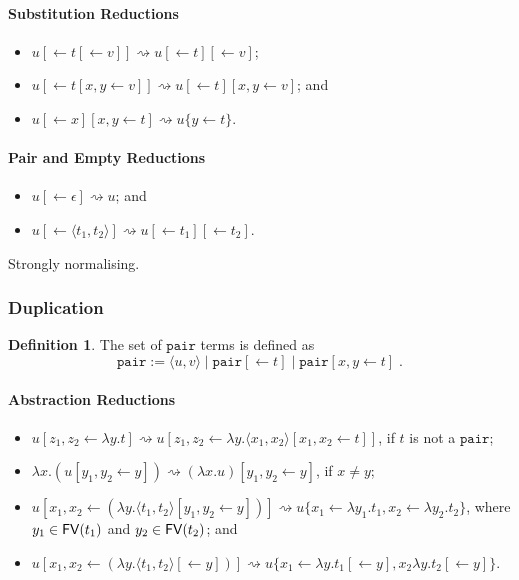 \documentclass[11pt,a4paper]{article}
\theoremstyle{definition}
\newtheorem{definition}{Definition}
\theoremstyle{plain}
\theoremstyle{remark}
\begin{document}
\paragraph{Substitution Reductions}

\begin{itemize}
	\item $u[\leftarrow t[\leftarrow v]]\rightsquigarrow u[\leftarrow t][\leftarrow v]$;
	\item $u[\leftarrow t[x,y\leftarrow v]]\rightsquigarrow u[\leftarrow t][x,y\leftarrow v]$; and
	\item $u[\leftarrow x][x,y\leftarrow t]\rightsquigarrow u\{y\leftarrow t\}$.
\end{itemize}

\paragraph{Pair and Empty Reductions}

\begin{itemize}
	\item $u[\leftarrow\epsilon]\rightsquigarrow u$; and
	\item $u[\leftarrow\langle t_1,t_2\rangle]\rightsquigarrow u[\leftarrow t_1][\leftarrow t_2]$.
\end{itemize}

Strongly normalising.

\subsubsection{Duplication}

\newcommand{\tpair}{{\mathtt{pair}}}

\begin{definition}
	The set of $\tpair$ terms is defined as
	\[\tpair:=\langle u,v\rangle\;|\;\tpair[\leftarrow t]\;|\;\tpair[x,y\leftarrow t]\;.\]
\end{definition}

\paragraph{Abstraction Reductions}

\begin{itemize}
	\item $u[z_1,z_2\leftarrow\lambda y.t]\rightsquigarrow u[z_1,z_2\leftarrow\lambda y.\langle x_1,x_2\rangle[x_1,x_2\leftarrow t]]$, if $t$ is not a $\tpair$;
	\item $\lambda x.(u[y_1,y_2\leftarrow y])\rightsquigarrow (\lambda x.u)[y_1,y_2\leftarrow y]$, if $x\neq y$;
	\item $u[x_1,x_2\leftarrow(\lambda y.\langle t_1,t_2\rangle[y_1,y_2\leftarrow y])]\rightsquigarrow u\{x_1\leftarrow\lambda y_1.t_1,x_2\leftarrow\lambda y_2.t_2\}$, where $y_1\in{\mathop{\mathsf{FV}}}(t_1)$ and $y_2\in{\mathop{\mathsf{FV}}}(t_2)$; and
	\item $u[x_1,x_2\leftarrow(\lambda y.\langle t_1,t_2\rangle[\leftarrow y])]\rightsquigarrow u\{x_1\leftarrow\lambda y.t_1[\leftarrow y],x_2\lambda y.t_2[\leftarrow y]\}$.
\end{itemize}
\end{document}
